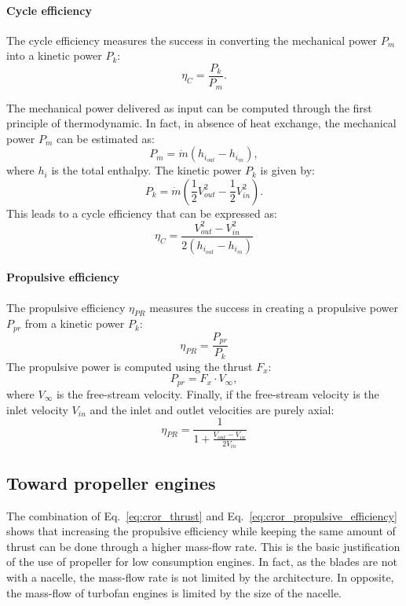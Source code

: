 \paragraph{Cycle efficiency}
The cycle efficiency measures the success in converting the mechanical
power $P_m$ into a kinetic power $P_k$:
\begin{equation}
	\eta_C = \frac{P_k}{P_m}.
\end{equation}

The mechanical power delivered as input
can be computed through the first principle of thermodynamic. In fact, in absence
of heat exchange, the mechanical power $P_m$ can be estimated as:
\begin{equation}
	P_m = \dot{m} (h_{i_{out}} - h_{i_{in}}),
\end{equation}
where $h_i$ is the total enthalpy.
The kinetic power $P_k$ is given by:
\begin{equation}
	P_k = \dot{m} \left(\frac{1}{2} V^2_{out} -
	\frac{1}{2} V^2_{in} \right).
\end{equation}
This leads to a cycle efficiency that can be expressed as:
\begin{equation}
	\eta_{C} = \frac{V^2_{out} - V^2_{in}}{2 (h_{i_{out}} - h_{i_{in}})}
\end{equation}

\paragraph{Propulsive efficiency}
The propulsive efficiency $\eta_{PR}$ measures the success
in creating a propulsive power $P_{pr}$ from a
kinetic power $P_k$:
\begin{equation}
	\eta_{PR} = \frac{P_{pr}}{P_k}
\end{equation}
The propulsive power is computed using the thrust $F_x$:
\begin{equation}
	P_{pr} = F_x \cdot V_{\infty},
\end{equation}
where $V_{\infty}$ is the free-stream velocity.
Finally, if the free-stream velocity is the inlet velocity $V_{in}$
and the inlet and outlet velocities are purely axial:
\begin{equation}
	\eta_{PR} = \frac{1}{1 + \frac{V_{out} - V_{in}}{2 V_{in}}}
	\label{eq:cror_propulsive_efficiency}
\end{equation}

\subsection{Toward propeller engines}
\label{sub:cror_toward_propeller}

The combination of Eq.~\eqref{eq:cror_thrust} and 
Eq.~\eqref{eq:cror_propulsive_efficiency} shows that
increasing the propulsive efficiency while keeping the same amount
of thrust can be done through a higher mass-flow rate. This is 
the basic justification of the use of propeller for low consumption engines.
In fact, as the blades are not with a nacelle, the mass-flow rate is not limited
by the architecture. In opposite, the mass-flow of 
turbofan engines is limited by the size of the nacelle.

